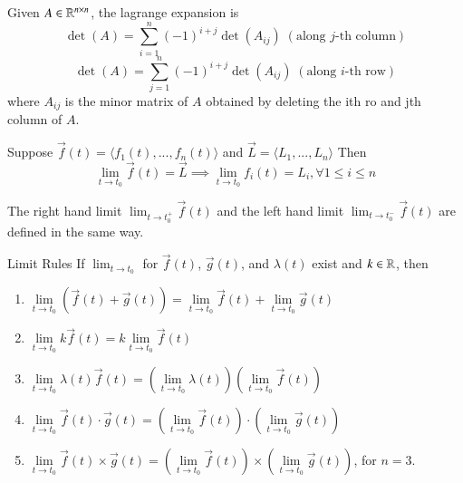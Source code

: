 \documentclass[12pt]{report}
\begin{document}
\begin{appendices}
    \begin{rec}{}{}
        Given $A \in \mathbb R^{n\times n}$, the lagrange expansion is \begin{equation}
            \det(A) = \sum\limits_{i=1}^n(-1)^{i+j}\det(A_{ij})\;(\text{along $j$-th column})
        \end{equation}
        \begin{equation}
            \det(A) = \sum\limits_{j=1}^n(-1)^{i+j}\det(A_{ij})\;(\text{along $i$-th row})
        \end{equation}
        where $A_{ij}$ is the minor matrix of $A$ obtained by deleting the ith ro and jth column of $A$.
    \end{rec}

    \begin{defn}{}{}
        Suppose $\vec{f}(t) = \langle f_1(t),...,f_n(t)\rangle$ and $\vec{L} = \langle L_1,...,L_n\rangle$ Then \begin{equation}
            \lim\limits_{t\rightarrow t_0}\vec{f}(t) = \vec{L} \implies \lim\limits_{t\rightarrow t_0}f_i(t) = L_i, \forall 1\leq i \leq n
        \end{equation}
    \end{defn}

    \begin{rmk}{}{}
        The right hand limit $\lim_{t\rightarrow t_0^+}\vec{f}(t)$ and the left hand limit $\lim_{t\rightarrow t_0^-}\vec{f}(t)$ are defined in the same way.
    \end{rmk}

    \begin{rmk}{Limit Rules}{}
        If $\lim_{t\rightarrow t_0}$ for $\vec{f}(t)$, $\vec{g}(t)$, and $\lambda(t)$ exist and $k \in \mathbb R$, then \begin{enumerate}
            \item $\lim\limits_{t\rightarrow t_0}(\vec{f}(t)+\vec{g}(t)) = \lim\limits_{t\rightarrow t_0}\vec{f}(t) + \lim\limits_{t\rightarrow t_0}\vec{g}(t)$
            \item $\lim\limits_{t\rightarrow t_0}k\vec{f}(t) = k\lim\limits_{t\rightarrow t_0}\vec{f}(t)$
            \item $\lim\limits_{t\rightarrow t_0}\lambda(t)\vec{f}(t) = (\lim\limits_{t\rightarrow t_0}\lambda(t))(\lim\limits_{t\rightarrow t_0}\vec{f}(t))$
            \item $\lim\limits_{t\rightarrow t_0}\vec{f}(t)\cdot \vec{g}(t) = (\lim\limits_{t\rightarrow t_0}\vec{f}(t))\cdot(\lim\limits_{t\rightarrow t_0}\vec{g}(t))$
            \item $\lim\limits_{t\rightarrow t_0}\vec{f}(t)\times \vec{g}(t) = (\lim\limits_{t\rightarrow t_0}\vec{f}(t))\times(\lim\limits_{t\rightarrow t_0}\vec{g}(t))$, for $n = 3$.
        \end{enumerate}
    \end{rmk}



\end{appendices}
\end{document}
